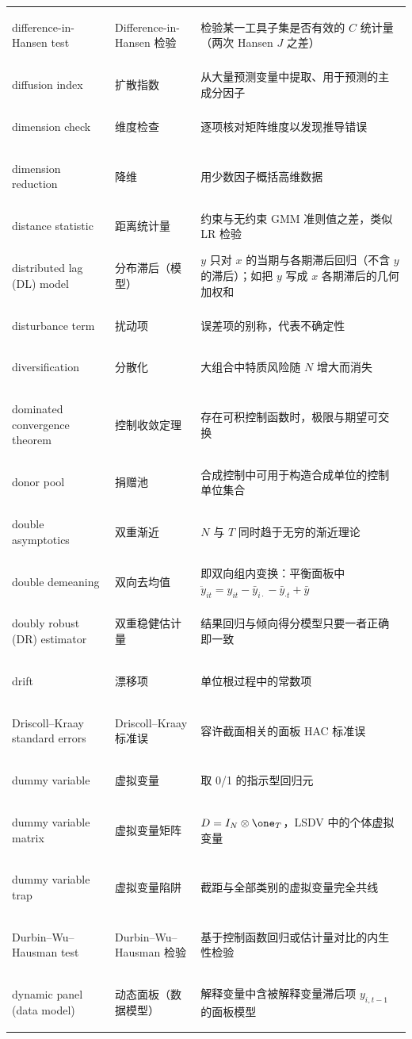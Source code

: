\begin{longtable}{@{}>{\bfseries\boldmath\raggedright\arraybackslash}p{4.6cm}>{\raggedright\arraybackslash}p{3.2cm}>{\raggedright\arraybackslash}p{\dimexpr\textwidth-7.8cm-4\tabcolsep\relax}@{}}
difference-in-Hansen test & Difference-in-Hansen 检验 & 检验某一工具子集是否有效的 $C$ 统计量（两次 Hansen $J$ 之差） \\
diffusion index & 扩散指数 & 从大量预测变量中提取、用于预测的主成分因子 \\
dimension check & 维度检查 & 逐项核对矩阵维度以发现推导错误 \\
dimension reduction & 降维 & 用少数因子概括高维数据 \\
distance statistic & 距离统计量 & 约束与无约束 GMM 准则值之差，类似 LR 检验 \\
distributed lag (DL) model & 分布滞后（模型） & $y$ 只对 $x$ 的当期与各期滞后回归（不含 $y$ 的滞后）；如把 $y$ 写成 $x$ 各期滞后的几何加权和 \\
disturbance term & 扰动项 & 误差项的别称，代表不确定性 \\
diversification & 分散化 & 大组合中特质风险随 $N$ 增大而消失 \\
dominated convergence theorem & 控制收敛定理 & 存在可积控制函数时，极限与期望可交换 \\
donor pool & 捐赠池 & 合成控制中可用于构造合成单位的控制单位集合 \\
double asymptotics & 双重渐近 & $N$ 与 $T$ 同时趋于无穷的渐近理论 \\
double demeaning & 双向去均值 & 即双向组内变换：平衡面板中 $\ddot y_{it}=y_{it}-\bar y_{i\cdot}-\bar y_{\cdot t}+\bar y$ \\
doubly robust (DR) estimator & 双重稳健估计量 & 结果回归与倾向得分模型只要一者正确即一致 \\
drift & 漂移项 & 单位根过程中的常数项 \\
Driscoll--Kraay standard errors & Driscoll--Kraay 标准误 & 容许截面相关的面板 HAC 标准误 \\
dummy variable & 虚拟变量 & 取 0/1 的指示型回归元 \\
dummy variable matrix & 虚拟变量矩阵 & $D=I_N\otimes\one_T$，LSDV 中的个体虚拟变量 \\
dummy variable trap & 虚拟变量陷阱 & 截距与全部类别的虚拟变量完全共线 \\
Durbin--Wu--Hausman test & Durbin--Wu--Hausman 检验 & 基于控制函数回归或估计量对比的内生性检验 \\
dynamic panel (data model) & 动态面板（数据模型） & 解释变量中含被解释变量滞后项 $y_{i,t-1}$ 的面板模型 \\
\end{longtable}

\par{}\ifdim\dimexpr\pagegoal-\pagetotal\relax<16\baselineskip\newpage\fi

